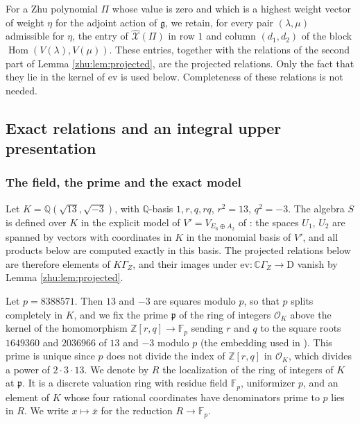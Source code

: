 \documentclass[leqno]{article}
\newcommand{\Cbb}{\ensuremath{\mathbb{C}}}
\newcommand{\D}{\mathrm{D}}
\newcommand{\co}{\colon}
\numberwithin{equation}{section}
\begin{document}
For a Zhu polynomial $\Pi$ whose value is zero and which is a highest weight vector of weight $\eta$ for the adjoint action of $\mathfrak g$, we retain, for every pair $(\lambda,\mu)$ admissible for $\eta$, the entry of $\widehat{\mathcal X}(\Pi)$ in row $1$ and column $(d_1,d_2)$ of the block $\operatorname{Hom}(V(\lambda),V(\mu))$. These entries, together with the relations of the second part of Lemma \ref{zhu:lem:projected}, are the projected relations. Only the fact that they lie in the kernel of $\mathrm{ev}$ is used below. Completeness of these relations is not needed.
\subsection{Exact relations and an integral upper presentation}
\label{zhu:sec:integral}

\subsubsection{The field, the prime and the exact model}
\label{zhu:subsec:field}

Let $K = \mathbb{Q}(\sqrt{13}, \sqrt{-3})$, with $\mathbb{Q}$-basis $1, r, q, rq$, $r^2 = 13$, $q^2 = -3$. The algebra $S$ is defined over $K$ in the explicit model of $V' = V_{E_6 \oplus A_2}$ of \cite[Section 10.1]{Arh26}: the spaces $U_1$, $U_2$ are spanned by vectors with coordinates in $K$ in the monomial basis of $V'$, and all products below are computed exactly in this basis. The projected relations below are therefore elements of $K\Gamma_Z$, and their images under $\mathrm{ev} \co \Cbb\Gamma_Z \to \D$ vanish by Lemma \ref{zhu:lem:projected}.

Let $p = 8388571$. Then $13$ and $-3$ are squares modulo $p$, so that $p$ splits completely in $K$, and we fix the prime $\mathfrak p$ of the ring of integers $\mathcal O_K$ above the kernel of the homomorphism $\mathbb{Z}[r,q] \to \mathbb F_p$ sending $r$ and $q$ to the square roots $1649360$ and $2036966$ of $13$ and $-3$ modulo $p$ (the embedding used in \cite[Theorem 11.6]{Arh26}). This prime is unique since $p$ does not divide the index of $\mathbb{Z}[r,q]$ in $\mathcal O_K$, which divides a power of $2 \cdot 3 \cdot 13$. We denote by $R$ the localization of the ring of integers of $K$ at $\mathfrak p$. It is a discrete valuation ring with residue field $\mathbb F_p$, uniformizer $p$, and an element of $K$ whose four rational coordinates have denominators prime to $p$ lies in $R$. We write $x \mapsto \bar x$ for the reduction $R \to \mathbb F_p$.
\end{document}
